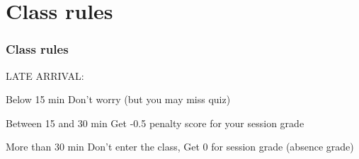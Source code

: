 \documentclass[aspectratio=169,15pt]{beamer}
\begin{document}
\section{Class rules}
\begin{frame}
    \frametitle{Class rules}

    LATE ARRIVAL:
    {
        \begin{block}{Below 15 min} Don’t worry (but you may miss quiz) \end{block}
    }
    {
        \begin{block}{Between 15 and 30 min} Get \alert{-0.5} penalty score for your session grade \end{block}
    }
    \begin{alertblock}{More than 30 min} Don’t enter the class, Get \alert{0} for session grade (absence grade) \end{alertblock}

\end{frame}
\end{document}
